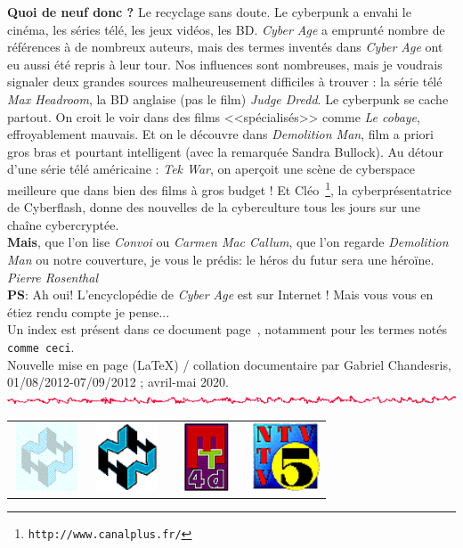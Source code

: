 \documentclass[11pt,twoside,a4paper]{article}
\def\imgCANHfond{\includegraphics[width=2.00cm,height=2.00cm]{img/fondhn.png} }
\def\imgCANHlogo{\includegraphics[width=2.00cm,height=2.00cm]{img/logohn.png} }
\def\imgCAMatrixTools{\includegraphics[width=2.00cm,height=2.00cm]{img/logomt4d.png} }
\def\imgCANTV555{\includegraphics[width=2.00cm,height=2.00cm]{img/logontv5.png} }
\def\barreCyberAge{\includegraphics[width=\textwidth]{img/Filet_CA.png}}
\begin{document}
\textbf{Quoi de neuf donc ?} Le recyclage sans doute. Le cyberpunk a envahi le cin{\'e}ma, les s{\'e}ries t{\'e}l{\'e}, les jeux vid{\'e}os, les BD. \emph{Cyber Age} a emprunt{\'e} nombre de r{\'e}f{\'e}rences {\`a} de nombreux auteurs, mais des termes invent{\'e}s dans \emph{Cyber Age} ont eu aussi {\'e}t{\'e} repris {\`a} leur tour. Nos influences sont nombreuses, mais je voudrais signaler deux grandes sources malheureusement difficiles {\`a} trouver : la s{\'e}rie t{\'e}l{\'e} \emph{Max Headroom}, la BD anglaise (pas le film) \emph{Judge Dredd}. Le cyberpunk se cache partout. On croit le voir dans des films <<sp{\'e}cialis{\'e}s>> comme \emph{Le cobaye}, effroyablement mauvais. Et on le d{\'e}couvre dans \emph{Demolition Man}, film a priori gros bras et pourtant intelligent (avec la remarqu{\'e}e Sandra Bullock). Au d{\'e}tour d'une s{\'e}rie t{\'e}l{\'e} am{\'e}ricaine : \emph{Tek War}, on aper\c{c}oit une sc{\`e}ne de cyberspace meilleure que dans bien des films {\`a} gros budget ! Et Cl{\'e}o~\footnote{\texttt{http://www.canalplus.fr/}}, la cyberpr{\'e}sentatrice de Cyberflash, donne des nouvelles de la cyberculture tous les jours sur une cha{\^i}ne cybercrypt{\'e}e.~\\

\textbf{Mais}, que l'on lise \emph{Convoi\texttrademark} ou \emph{Carmen Mac Callum}, que l'on regarde \emph{Demolition Man} ou notre couverture, je vous le pr{\'e}dis: le h{\'e}ros du futur sera une h{\'e}ro{\"i}ne.~\\

\emph{Pierre Rosenthal}~\\

\textbf{PS}: Ah oui! L'encyclop{\'e}die de \emph{Cyber Age} est sur Internet ! Mais vous vous en {\'e}tiez rendu compte je pense... ~\\

Un index est pr{\'e}sent dans ce document page~\pageref{index}, notamment pour les termes not{\'e}s \texttt{comme ceci}. ~\\

Nouvelle mise en page (\LaTeX) / collation documentaire par Gabriel Chandesris, 01/08/2012-07/09/2012 ; avril-mai 2020. ~\\

\barreCyberAge

\begin{center}
	\begin{tabular}[ht]{ c c c c }
		\imgCANHfond	&	\imgCANHlogo	&	\imgCAMatrixTools	&	\imgCANTV555	\\
	\end{tabular}
\end{center}
\end{document}

